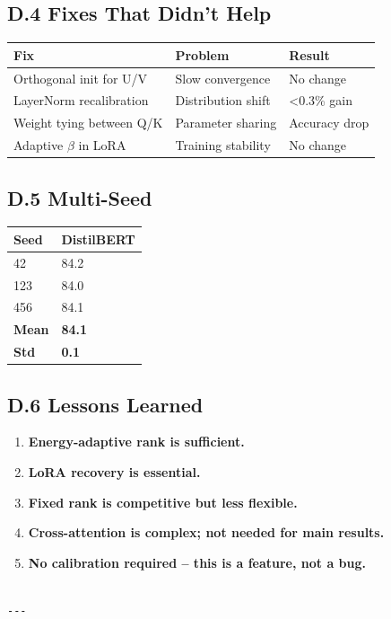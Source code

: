 \subsection{D.4 Fixes That Didn't Help}

\begin{table}[H]
\centering
\small
\begin{tabular}{lll}
\toprule
\textbf{Fix} & \textbf{Problem} & \textbf{Result} \\
\midrule
Orthogonal init for U/V & Slow convergence & No change \\
LayerNorm recalibration & Distribution shift & \textless{}0.3\% gain \\
Weight tying between Q/K & Parameter sharing & Accuracy drop \\
Adaptive $\beta$ in LoRA & Training stability & No change \\
\bottomrule
\end{tabular}
\end{table}

\subsection{D.5 Multi-Seed}

\begin{table}[H]
\centering
\small
\begin{tabular}{ll}
\toprule
\textbf{Seed} & \textbf{DistilBERT} \\
\midrule
42 & 84.2 \\
123 & 84.0 \\
456 & 84.1 \\
\textbf{Mean} & \textbf{84.1} \\
\textbf{Std} & \textbf{0.1} \\
\bottomrule
\end{tabular}
\end{table}

\subsection{D.6 Lessons Learned}

\begin{enumerate}
\item \textbf{Energy-adaptive rank is sufficient.}
\item \textbf{LoRA recovery is essential.}
\item \textbf{Fixed rank is competitive but less flexible.}
\item \textbf{Cross-attention is complex; not needed for main results.}
\item \textbf{No calibration required -- this is a feature, not a bug.}
\end{enumerate}
\begin{lstlisting}

---
\end{lstlisting}

